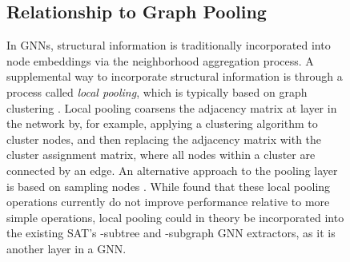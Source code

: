 \begin{figure}[htbp]
{\subsection{Relationship to Graph Pooling}
In GNNs, structural information is traditionally incorporated into node embeddings via the neighborhood aggregation process. A supplemental way to incorporate structural information is through a process called \emph{local pooling}, which is typically based on graph clustering \citep{ying2018hierarchical}. Local pooling coarsens the adjacency matrix at layer  in the network by, for example, applying a clustering algorithm to cluster nodes, and then replacing the adjacency matrix with the cluster assignment matrix, where all nodes within a cluster are connected by an edge. An alternative approach to the pooling layer is based on sampling nodes \citep{gao2019graph}. While \citet{rethinkpooling2020} found that these local pooling operations currently do not improve performance relative to more simple operations, local pooling could in theory be incorporated into the existing SAT's -subtree and -subgraph GNN extractors, as it is another layer in a GNN.
}

\begin{comment}
    "Graph pooling based on graph clustering can be used to identify structural similarity between nodes.
Understand the structural information of a graph using subgraphs or graph pooling."
\end{comment}


\end{figure}